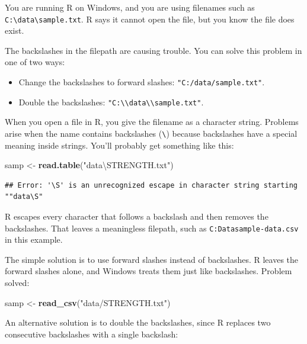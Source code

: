 \documentclass[
]{book}
\newenvironment{Shaded}{\begin{snugshade}}{\end{snugshade}}
\newcommand{\KeywordTok}[1]{\textcolor[rgb]{0.13,0.29,0.53}{\textbf{#1}}}
\newcommand{\NormalTok}[1]{#1}
\newcommand{\StringTok}[1]{\textcolor[rgb]{0.31,0.60,0.02}{#1}}
\begin{document}
You are running R on Windows, and you are using filenames such as
\texttt{C:\textbackslash{}data\textbackslash{}sample.txt}. R says it cannot open the file, but you know the
file does exist.

The backslashes in the filepath are causing trouble. You can solve this
problem in one of two ways:

\begin{itemize}
\item
  Change the backslashes to forward slashes: \texttt{"C:/data/sample.txt"}.
\item
  Double the backslashes: \texttt{"C:\textbackslash{}\textbackslash{}data\textbackslash{}\textbackslash{}sample.txt"}.
\end{itemize}

When you open a file in R, you give the filename as a character string.
Problems arise when the name contains backslashes (\texttt{\textbackslash{}}) because
backslashes have a special meaning inside strings. You'll probably get
something like this:

\begin{Shaded}
\begin{Highlighting}[]
\NormalTok{samp <-}\StringTok{ }\KeywordTok{read.table}\NormalTok{(}\StringTok{"data\textbackslash{}STRENGTH.txt"}\NormalTok{)}
\end{Highlighting}
\end{Shaded}

\begin{verbatim}
## Error: '\S' is an unrecognized escape in character string starting ""data\S"
\end{verbatim}

R escapes every character that follows a backslash and then removes the
backslashes. That leaves a meaningless filepath, such as
\texttt{C:Datasample-data.csv} in this example.

The simple solution is to use forward slashes instead of backslashes. R
leaves the forward slashes alone, and Windows treats them just like
backslashes. Problem solved:

\begin{Shaded}
\begin{Highlighting}[]
\NormalTok{samp <-}\StringTok{ }\KeywordTok{read_csv}\NormalTok{(}\StringTok{"data/STRENGTH.txt"}\NormalTok{)}
\end{Highlighting}
\end{Shaded}

An alternative solution is to double the backslashes, since R replaces
two consecutive backslashes with a single backslash:
\end{document}
